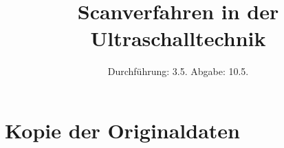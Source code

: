 

\subject{US 2}
\title{Scanverfahren in der Ultraschalltechnik}
\date{
  Durchführung: 3.5.
  \hspace{3em}
  Abgabe: 10.5.
}



\maketitle
\thispagestyle{empty}
\tableofcontents
\newpage






\printbibliography

\appendix
\section{Kopie der Originaldaten}


